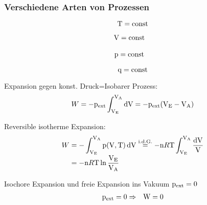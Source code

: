 \subsubsection{Verschiedene Arten von Prozessen}
\label{subsec:Verschiedene_Arten_von_Prozessen}
\begin{defnbox}
  \begin{defn}\nospacing
    \begin{equation}
      \mathrm{T}=\text{const}
    \end{equation}
  \end{defn}
\end{defnbox}
\begin{defnbox}
  \begin{defn}\nospacing
    \begin{align}
      &\mathrm{V}=\text{const}
    \end{align}
  \end{defn}
\end{defnbox}
\begin{defnbox}
  \begin{defn}\nospacing
    \begin{align}
      &\mathrm{p}=\text{const}
    \end{align}
  \end{defn}
\end{defnbox}
\begin{defnbox}
  \begin{defn}\nospacing
    \begin{equation}
      \mathrm{q}=\text{const}
    \end{equation}
  \end{defn}
\end{defnbox}
\begin{notebox}\nospacing
  \begin{numberlist}
      \item Expansion gegen konst. Druck=Isobarer Prozess:
        \begin{equation*}
        W=-\pz_{\text{ext}}\int_{\Vz_{\text{E}}}^{\Vz_{\text{A}}}\diff\Vz=-\pz_{\text{ext}}(\Vz_{\text{E}}-\Vz_{\text{A}})
        \end{equation*}
      \item Reversible isotherme Expansion:
        \begin{align*}
          W&=-\int_{\Vz_{\text{E}}}^{\Vz_{\text{A}}}\pz(\Vz,\Tz)\diff\Vz\stackrel{\text{i.d.G.}}{=}-\nz\Rc\Tz\int_{\Vz_{\text{E}}}^{\Vz_{\text{A}}}\frac{\diff \Vz}{\Vz}\nalign
          &=-\nz\Rc\Tz\ln\frac{\Vz_{\text{E}}}{\Vz_{\text{A}}}
        \end{align*}
          \item Isochore Expansion und freie Expansion ins Vakuum $\mathrm{p}_{\text{ext}}=0$
        \begin{align*}
          \mathrm{p}_{\text{ext}}=0&\Rightarrow&\mathrm{W}=0
        \end{align*}
  \end{numberlist}
\end{notebox}
